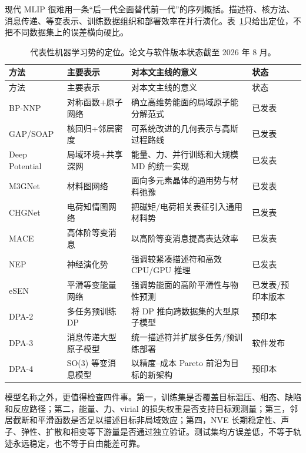 \documentclass[UTF8,10pt,a4paper,fontset=none]{ctexart}
\begin{document}
现代 MLIP 很难用一条“后一代全面替代前一代”的序列概括。描述符、核方法、消息传递、等变表示、训练数据组织和部署效率在并行演化。表~\ref{tab:mlip}只给出定位，不把不同数据集上的误差横向硬比。

\begin{longtable}{>{\raggedright\arraybackslash}p{}>{\raggedright\arraybackslash}p{}>{\raggedright\arraybackslash}p{}>{\raggedright\arraybackslash}p{}}
\caption{代表性机器学习势的定位。论文与软件版本状态截至 2026 年 8 月。}\label{tab:mlip}\\
\toprule
方法 & 主要表示 & 对本文主线的意义 & 状态 \\
\midrule
\endfirsthead
\toprule
方法 & 主要表示 & 对本文主线的意义 & 状态 \\
\midrule
\endhead
BP-NNP & 对称函数+原子网络 & 确立高维势能面的局域原子能分解范式\cite{behler2007} & 已发表 \\
GAP/\allowbreak SOAP & 核回归+邻居密度 & 可系统改进的几何表示与高斯过程路线\cite{bartok2010} & 已发表 \\
Deep Potential & 局域环境+共享深网 & 能量、力、并行训练和大规模 MD 的统一实现\cite{han2018,zhang2018deepmd} & 已发表 \\
M3GNet & 材料图网络 & 面向多元素晶体的通用势与材料弛豫\cite{chen2022m3gnet} & 已发表 \\
CHGNet & 电荷知情图网络 & 把磁矩/电荷相关表征引入通用材料势\cite{deng2023chgnet} & 已发表 \\
MACE & 高体阶等变消息 & 以高阶等变消息提高表达效率\cite{batatia2022mace} & 已发表 \\
NEP & 神经演化势 & 强调较紧凑描述符和高效 CPU/GPU 推理\cite{fan2022nep} & 已发表 \\
eSEN & 平滑等变能量网络 & 强调势能面的高阶平滑性与物性预测\cite{fu2025esen} & 已发表/预印本版本 \\
DPA-2 & 多任务预训练 DP & 将 DP 推向跨数据集的大型原子模型\cite{zhang2024dpa2} & 预印本 \\
DPA-3 & 消息传递大型原子模型 & 统一描述符并扩展多任务/预训练部署\cite{deepmdkit2026dpa3} & 软件发布 \\
DPA-4 & SO(3) 等变消息模型 & 以精度--成本 Pareto 前沿为目标的新架构\cite{li2026dpa4} & 2026 预印本 \\
\bottomrule
\end{longtable}

模型名称之外，更值得检查四件事。第一，训练集是否覆盖目标温压、相态、缺陷和反应路径；第二，能量、力、virial 的损失权重是否支持目标观测量；第三，邻居截断和平滑函数是否足以描述目标非局域效应；第四，NVE 长期稳定性、声子、弹性、扩散和相变等下游量是否通过独立验证。测试集均方误差低，不等于轨迹永远稳定，也不等于自由能差可靠。
\end{document}
